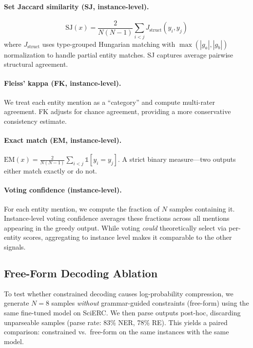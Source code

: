 \documentclass[11pt,a4paper]{article}
\begin{document}
\paragraph{Set Jaccard similarity (SJ, instance-level).}
\begin{equation}
\text{SJ}(x) = \frac{2}{N(N{-}1)} \sum_{i<j} J_{\text{struct}}(y_i, y_j)
\end{equation}
where $J_{\text{struct}}$ uses type-grouped Hungarian matching with $\max(|g_a|, |g_b|)$ normalization to handle partial entity matches. SJ captures average pairwise structural agreement.

\paragraph{Fleiss' kappa (FK, instance-level).} We treat each entity mention as a ``category'' and compute multi-rater agreement. FK adjusts for chance agreement, providing a more conservative consistency estimate.

\paragraph{Exact match (EM, instance-level).} $\text{EM}(x) = \frac{2}{N(N{-}1)} \sum_{i<j} \mathbb{1}[y_i = y_j]$. A strict binary measure---two outputs either match exactly or do not.

\paragraph{Voting confidence (instance-level).} For each entity mention, we compute the fraction of $N$ samples containing it. Instance-level voting confidence averages these fractions across all mentions appearing in the greedy output. While voting \emph{could} theoretically select via per-entity scores, aggregating to instance level makes it comparable to the other signals.

\subsection{Free-Form Decoding Ablation}

To test whether constrained decoding causes log-probability compression, we generate $N{=}8$ samples \emph{without} grammar-guided constraints (free-form) using the same fine-tuned model on SciERC. We then parse outputs post-hoc, discarding unparseable samples (parse rate: 83\% NER, 78\% RE). This yields a paired comparison: constrained vs.\ free-form on the same instances with the same model.
\end{document}

